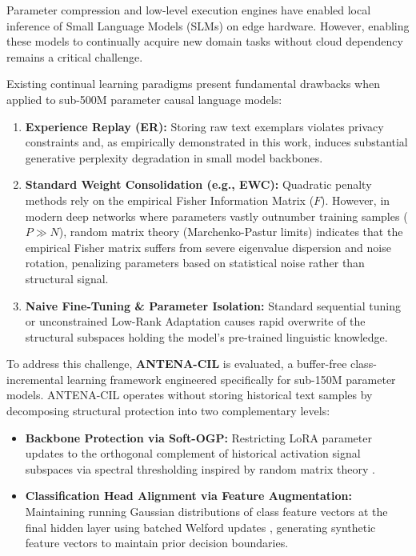 \documentclass[11pt,a4paper]{article}
\begin{document}
Parameter compression and low-level execution engines have enabled local inference of Small Language Models (SLMs) on edge hardware. However, enabling these models to continually acquire new domain tasks without cloud dependency remains a critical challenge.

Existing continual learning paradigms present fundamental drawbacks when applied to sub-500M parameter causal language models:

\begin{enumerate}
    \item \textbf{Experience Replay (ER):} Storing raw text exemplars violates privacy constraints and, as empirically demonstrated in this work, induces substantial generative perplexity degradation in small model backbones.
    \item \textbf{Standard Weight Consolidation (e.g., EWC):} Quadratic penalty methods rely on the empirical Fisher Information Matrix ($F$). However, in modern deep networks where parameters vastly outnumber training samples ($P \gg N$), random matrix theory (Marchenko-Pastur limits) indicates that the empirical Fisher matrix suffers from severe eigenvalue dispersion and noise rotation, penalizing parameters based on statistical noise rather than structural signal.
    \item \textbf{Naive Fine-Tuning \& Parameter Isolation:} Standard sequential tuning or unconstrained Low-Rank Adaptation \citep[LoRA;][]{hu2022lora} causes rapid overwrite of the structural subspaces holding the model's pre-trained linguistic knowledge.
\end{enumerate}

To address this challenge, \textbf{ANTENA-CIL} is evaluated, a buffer-free class-incremental learning framework engineered specifically for sub-150M parameter models. ANTENA-CIL operates without storing historical text samples by decomposing structural protection into two complementary levels:

\begin{itemize}
    \item \textbf{Backbone Protection via Soft-OGP:} Restricting LoRA parameter updates to the orthogonal complement of historical activation signal subspaces via spectral thresholding inspired by random matrix theory \citep{ledoit2011eigenvectors}.
    \item \textbf{Classification Head Alignment via Feature Augmentation:} Maintaining running Gaussian distributions of class feature vectors at the final hidden layer using batched Welford updates \citep{welford1962note}, generating synthetic feature vectors to maintain prior decision boundaries.
\end{itemize}
\end{document}
